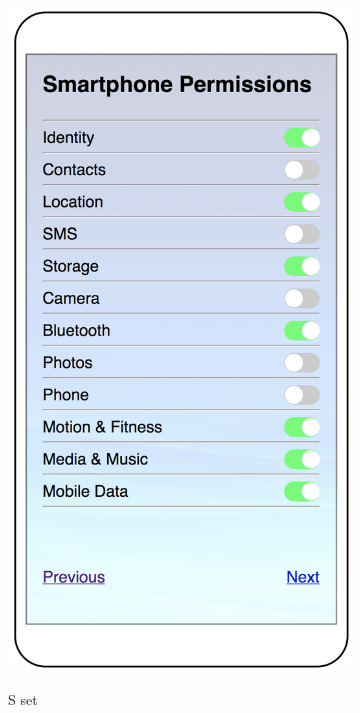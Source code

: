 \begin{figure}
	\begin{subfigure}[b]{0.24\textheight}
		\includegraphics[width=0.24\textheight]{figures/default3.png}
		\label{fig:defaultc}
		\caption{S set}
	\end{subfigure}
	\begin{subfigure}[b]{0.24\textheight}

\end{subfigure}
\end{figure}
